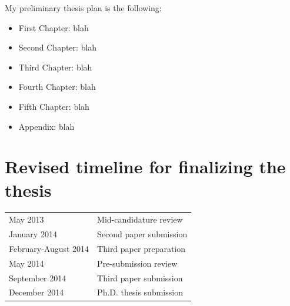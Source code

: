 \documentclass[useAMS,usenatbib,onecolumn]{mnras}
\begin{document}
  My preliminary thesis plan is the following:
  \begin{itemize}
    \item{First Chapter: } blah
    \item{Second Chapter:} blah
    \item{Third Chapter:} blah
    \item{Fourth Chapter:} blah
    \item{Fifth Chapter:} blah
    \item{Appendix:} blah
  \end{itemize}



\section{Revised timeline for finalizing the thesis}
\label{sec:timeline}

\begin{tabular*}{0.75\textwidth}{ l l }
  May 2013                  & Mid-candidature review \\
  January 2014                & Second paper submission \\
  February-August 2014              & Third paper preparation \\
  May 2014                  & Pre-submission review \\
  September 2014              & Third paper submission \\
  December 2014               & Ph.D. thesis submission \\
\end{tabular*}



\begin{multicols}{2}
	
	{\footnotesize
	\setlength{\itemsep}{1pt}
	\begin{spacing}{0.5}
		{}
	\end{spacing}	}
\end{multicols}
\end{document}
